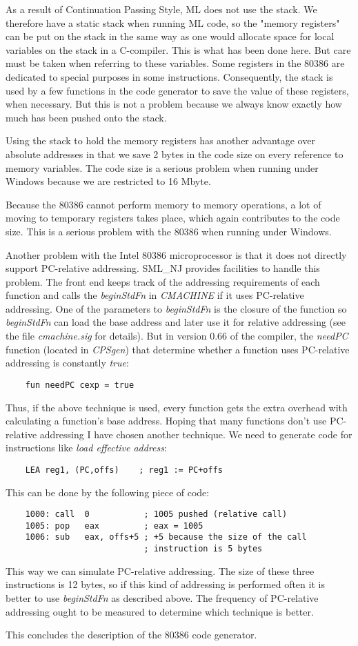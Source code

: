 As a result of Continuation Passing Style, ML does not use the stack.
We therefore have a static stack when running ML code, so the "memory
registers" can be put on the stack in the same way as one would
allocate space for local variables on the stack in a C-compiler.  This
is what has been done here. But care must be taken when referring to
these variables. Some registers in the 80386 are dedicated to special
purposes in some instructions. Consequently, the stack is used by a few
functions in the code generator to save the value of these registers,
when necessary. But this is not a problem because we always know
exactly how much has been pushed onto the stack.

Using the stack to hold the memory registers has another advantage
over absolute addresses in that we save 2 bytes in the code size on
every reference to memory variables. The code size is a serious
problem when running under Windows because we are restricted to 16
Mbyte.

Because the 80386 cannot perform memory to memory operations, a lot of
moving to temporary registers takes place, which again contributes to
the code size. This is a serious problem with the 80386 when running
under Windows.

Another problem with the Intel 80386 microprocessor is that it does
not directly support PC-relative addressing. SML\_NJ provides
facilities to handle this problem. The front end keeps track of the
addressing requirements of each function and calls the {\em
beginStdFn\/} in {\em CMACHINE\/} if it uses PC-relative addressing.
One of the parameters to {\em beginStdFn\/} is the closure of the
function so {\em beginStdFn} can load the base address and later use
it for relative addressing (see the file {\em cmachine.sig} for
details). But in version 0.66 of the compiler, the {\em needPC\/}
function (located in {\em CPSgen\/}) that determine whether a function
uses PC-relative addressing is constantly {\em true\/}:
\begin{verbatim}
    fun needPC cexp = true
\end{verbatim}
Thus, if the above technique is used, every function gets the extra
overhead with calculating a function's base address. Hoping that many
functions don't use PC-relative addressing I have chosen another
technique. We need to generate code for instructions like {\em load
effective address}:
\begin{verbatim}
    LEA reg1, (PC,offs)    ; reg1 := PC+offs
\end{verbatim}
This can be done by the following piece of code:
\begin{verbatim}
    1000: call  0           ; 1005 pushed (relative call)
    1005: pop   eax         ; eax = 1005
    1006: sub   eax, offs+5 ; +5 because the size of the call 
                            ; instruction is 5 bytes
\end{verbatim}
This way we can simulate PC-relative addressing. The size of these
three instructions is 12 bytes, so if this kind of addressing is
performed often it is better to use {\em beginStdFn\/} as described
above. The frequency of PC-relative addressing ought to be measured to
determine which technique is better.

This concludes the description of the 80386 code generator.